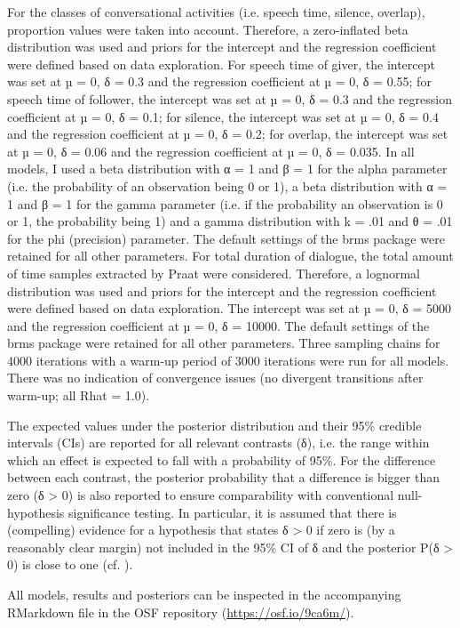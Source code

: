 For the classes of conversational activities (i.e. speech time, silence, overlap), proportion values were taken into account. Therefore, a zero-inflated beta distribution was used and priors for the intercept and the regression coefficient were defined based on data exploration. For speech time of giver, the intercept was set at µ = 0, δ = 0.3 and the regression coefficient at µ = 0, δ = 0.55; for speech time of follower, the intercept was set at µ = 0, δ = 0.3 and the regression coefficient at µ = 0, δ = 0.1; for silence, the intercept was set at µ = 0, δ = 0.4 and the regression coefficient at µ = 0, δ = 0.2; for overlap, the intercept was set at µ = 0, δ = 0.06 and the regression coefficient at µ = 0, δ = 0.035. In all models, I used a beta distribution with α = 1 and β = 1 for the alpha parameter (i.e. the probability of an observation being 0 or 1), a beta distribution with α = 1 and β = 1 for the gamma parameter (i.e. if the probability an observation is 0 or 1, the probability being 1) and a gamma distribution with k = .01 and θ = .01 for the phi (precision) parameter. The default settings of the brms package were retained for all other parameters. For total duration of dialogue, the total amount of time samples extracted by Praat were considered. Therefore, a lognormal distribution was used and priors for the intercept and the regression coefficient were defined based on data exploration. The intercept was set at µ = 0, δ = 5000 and the regression coefficient at µ = 0, δ = 10000. The default settings of the brms package were retained for all other parameters. Three sampling chains for 4000 iterations with a warm-up period of 3000 iterations were run for all models. There was no indication of convergence issues (no divergent transitions after warm-up; all Rhat = 1.0).

The expected values under the posterior distribution and their 95\% credible intervals (CIs) are reported for all relevant contrasts (δ), i.e. the range within which an effect is expected to fall with a probability of 95\%. For the difference between each contrast, the posterior probability that a difference is bigger than zero (δ > 0) is also reported to ensure comparability with conventional null-hypothesis significance testing. In particular, it is assumed that there is (compelling) evidence for a hypothesis that states δ > 0 if zero is (by a reasonably clear margin) not included in the 95\% CI of δ and the posterior P(δ > 0) is close to one (cf. \citealt{FrankeRoettger2019}).

All models, results and posteriors can be inspected in the accompanying RMarkdown file in the OSF repository (\url{https://osf.io/9ca6m/}).

